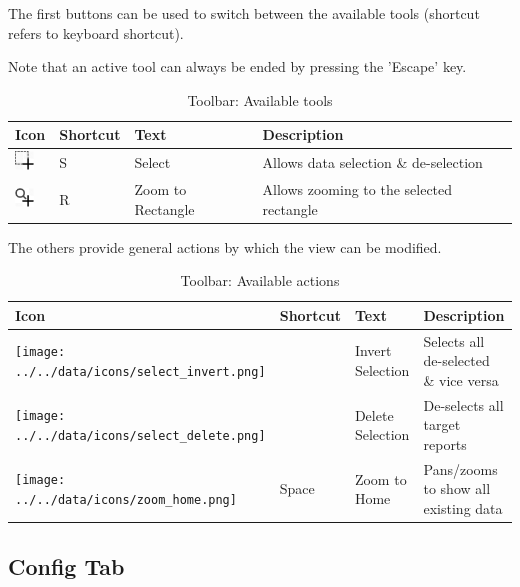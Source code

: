 The first buttons can be used to switch between the available tools (shortcut refers to keyboard shortcut).

Note that an active tool can always be ended by pressing the 'Escape' key. 

\begin{table}[H]
  \center
  \begin{tabular}{ | l | l | l | l |}
    \hline
    \textbf{Icon} & \textbf{Shortcut} & \textbf{Text} &  \textbf{Description} \\ \hline
    \includegraphics[width=0.5cm,frame]{../../data/icons/select_action.png} & S & Select & Allows data selection \& de-selection \\ \hline
    \includegraphics[width=0.5cm,frame]{../../data/icons/zoom_select_action.png} & R & Zoom to Rectangle & Allows zooming to the selected rectangle \\ \hline
    
  \end{tabular}
  \caption{Toolbar: Available tools}
\end{table}

The others provide general actions by which the view can be modified.

\begin{table}[H]
  \center
  \begin{tabular}{ | l | l | l | l |}
    \hline
    \textbf{Icon} & \textbf{Shortcut} &\textbf{Text} &  \textbf{Description} \\ \hline
    \texttt{[image: ../../data/icons/select\_invert.png]} & & Invert Selection & Selects all de-selected \& vice versa \\ \hline
    \texttt{[image: ../../data/icons/select\_delete.png]} & & Delete Selection & De-selects all target reports \\ \hline
    \texttt{[image: ../../data/icons/zoom\_home.png]} & Space & Zoom to Home & Pans/zooms to show all existing data \\ \hline
  \end{tabular}
  \caption{Toolbar: Available actions}
\end{table} 

\subsection{Config Tab}

